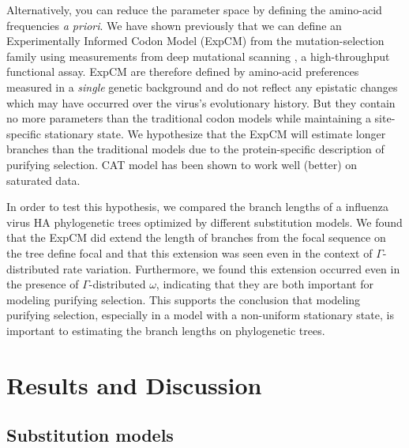 \documentclass[11pt]{article}
\newcommand\skhcomment[1]{{\color{cyan}#1}}
\begin{document}
Alternatively, you can reduce the parameter space by defining the amino-acid frequencies \textit{a priori}. 
We have shown previously that we can define an Experimentally Informed Codon Model (ExpCM) \citep{bloom2014experimentally,bloom2014informed} from the mutation-selection family using measurements from deep mutational scanning \citep{fowler2014deep}, a high-throughput functional assay. 
ExpCM are therefore defined by amino-acid preferences measured in a \textit{single} genetic background and do not reflect any epistatic changes which may have occurred over the virus's evolutionary history. 
But they contain no more parameters than the traditional codon models while maintaining a site-specific stationary state. 
We hypothesize that the ExpCM will estimate longer branches than the traditional models due to the protein-specific description of purifying selection. 
\skhcomment{CAT model has been shown to work well (better) on saturated data.}

In order to test this hypothesis, we compared the branch lengths of a influenza virus HA phylogenetic trees optimized by different substitution models. 
We found that the ExpCM did extend the length of branches from the focal sequence on the tree \skhcomment{define focal} and that this extension was seen even in the context of $\Gamma$-distributed rate variation. 
Furthermore, we found this extension occurred even in the presence of $\Gamma$-distributed $\omega$, indicating that they are both important for modeling purifying selection. 
This supports the conclusion that modeling purifying selection, especially in a model with a non-uniform stationary state, is important to estimating the branch lengths on phylogenetic trees. 

\section*{Results and Discussion}

\subsection*{Substitution models}
\end{document}
